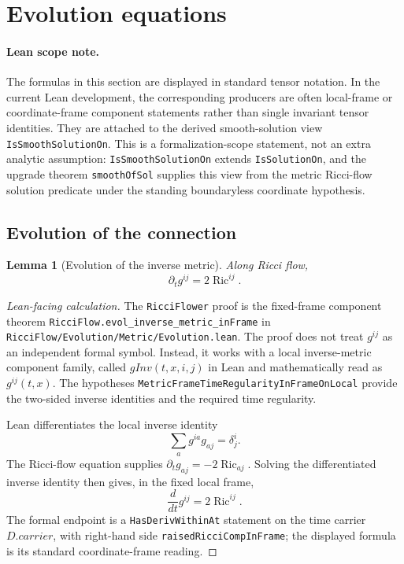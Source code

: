 \documentclass[11pt]{article}
\theoremstyle{plain}
\newtheorem{lemma}[theorem]{Lemma}
\theoremstyle{definition}
\theoremstyle{remark}
\newcommand{\Ric}{\operatorname{Ric}}
\newcommand{\leanref}[1]{\nolinkurl{#1}}
\newcommand{\leanfile}[1]{\nolinkurl{#1}}
\newcommand{\rffile}[1]{\leanfile{#1}}
\begin{document}
\section{Evolution equations}

\paragraph{Lean scope note.}
The formulas in this section are displayed in standard tensor notation.  In the
current Lean development, the corresponding producers are often local-frame or
coordinate-frame component statements rather than single invariant tensor
identities.  They are attached to the derived smooth-solution view
\leanref{IsSmoothSolutionOn}.  This is a formalization-scope statement, not an
extra analytic assumption: \leanref{IsSmoothSolutionOn} extends
\leanref{IsSolutionOn}, and the upgrade theorem \leanref{smoothOfSol} supplies
this view from the metric Ricci-flow solution predicate under the standing
boundaryless coordinate hypothesis.

\subsection{Evolution of the connection}

\begin{lemma}[Evolution of the inverse metric]
\label{lem:evol-inverse-metric}
Along Ricci flow,
\[
\partial_tg^{ij}=2\Ric^{ij}.
\]
\end{lemma}

\begin{proof}[Lean-facing calculation]
The \texttt{RicciFlower} proof is the fixed-frame component theorem
\leanref{RicciFlow.evol_inverse_metric_inFrame} in
\rffile{RicciFlow/Evolution/Metric/Evolution.lean}.  The proof does not treat
\(g^{ij}\) as an independent formal symbol.  Instead, it works with a local
inverse-metric component family, called \(gInv(t,x,i,j)\) in Lean and
mathematically read as \(g^{ij}(t,x)\).  The hypotheses
\leanref{MetricFrameTimeRegularityInFrameOnLocal} provide the two-sided inverse
identities and the required time regularity.

Lean differentiates the local inverse identity
\[
  \sum_a g^{ia}g_{aj}=\delta^i_j .
\]
The Ricci-flow equation supplies
\(\partial_tg_{aj}=-2\Ric_{aj}\).  Solving the differentiated inverse identity
then gives, in the fixed local frame,
\[
  \frac d{dt}g^{ij}=2\Ric^{ij}.
\]
The formal endpoint is a \texttt{HasDerivWithinAt} statement on the time
carrier \(D.carrier\), with right-hand side
\leanref{raisedRicciCompInFrame}; the displayed formula is its standard
coordinate-frame reading.
\end{proof}
\end{document}
